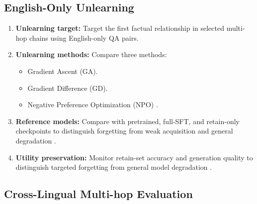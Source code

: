 \documentclass[10pt,a4paper]{article}
\begin{document}
\subsection{English-Only Unlearning}

\begin{enumerate}
    \item \textbf{Unlearning target:}
    Target the first factual relationship in selected
    multi-hop chains using English-only QA pairs.

    \item \textbf{Unlearning methods:}
    Compare three methods:
    \begin{itemize}
        \item Gradient Ascent (GA).
        \item Gradient Difference (GD).
        \item Negative Preference Optimization (NPO)
        \cite{zhang2024npo}.
    \end{itemize}

    \item \textbf{Reference models:}
    Compare with pretrained, full-SFT, and retain-only
    checkpoints to distinguish forgetting from weak
    acquisition and general degradation
    \cite{waseem2026falsepositive,maini2024tofu}.

    \item \textbf{Utility preservation:}
    Monitor retain-set accuracy and generation quality
    to distinguish targeted forgetting from
    general model degradation
    \cite{zhang2024npo,thaker2025weak}.
\end{enumerate}


\subsection{Cross-Lingual Multi-hop Evaluation}
\end{document}
